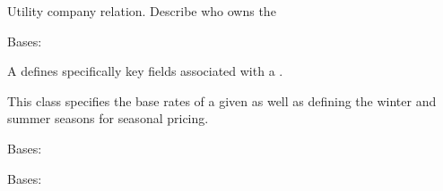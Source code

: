 \documentclass[letterpaper,10pt,english]{sphinxmanual}
\begin{document}
\begin{fulllineitems}

\begin{fulllineitems}
\label{modules/webapp:webapp.models.RatePlan.utility_company}
Utility company relation. Describe who owns the {\hyperref[modules/webapp:webapp.models.RatePlan]{\emph{}}}

\end{fulllineitems}


\end{fulllineitems}


\begin{fulllineitems}
\label{modules/webapp:webapp.models.Territory}
Bases: 

A {\hyperref[modules/webapp:webapp.models.Territory]{\emph{}}} defines specifically key fields associated with a {\hyperref[modules/webapp:webapp.models.RatePlan]{\emph{}}}.

This class specifies the base rates of a given {\hyperref[modules/webapp:webapp.models.RatePlan]{\emph{}}} as well as defining
the winter and summer seasons for seasonal pricing.

\begin{fulllineitems}
\label{modules/webapp:webapp.models.Territory.DoesNotExist}
Bases: 

\end{fulllineitems}


\begin{fulllineitems}
\label{modules/webapp:webapp.models.Territory.MultipleObjectsReturned}
Bases: 

\end{fulllineitems}



\end{fulllineitems}
\end{document}
